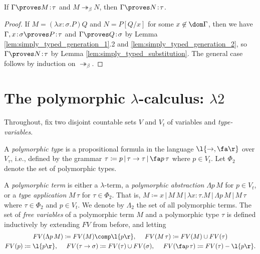 \documentclass[reqno]{amsart}
\begin{document}
    \begin{theorem}\label{thm:simply_typed_subject_reduction}
        If $\Gamma\proves M\!:\!\tau$ and $M\twoheadrightarrow_\beta N$, then $\Gamma\proves N\!:\!\tau$.
    \end{theorem}
    \begin{proof}
        If $M=(\lambda x\!:\!\sigma.P)Q$ and $N=P[Q/x]$ for some $x\not\in\dom\Gamma$, then we have $\Gamma,x\!:\!\sigma\proves P\!:\!\tau$ and $\Gamma\proves Q\!:\!\sigma$ by Lemma \ref{lem:simply_typed_generation_1}.2 and \ref{lem:simply_typed_generation_2}, so $\Gamma\proves N\!:\!\tau$ by Lemma \ref{lem:simply_typed_substitution}. The general case follows by induction on $\twoheadrightarrow_\beta$.
    \end{proof}

    \section{The polymorphic $\lambda$-calculus: $\lambda2$}

    Throughout, fix two disjoint countable sets $V$ and $V_t$ of variables and \textit{type-variables}.

    \begin{definition}
        A \textit{polymorphic type} is a propositional formula in the language $\l\{\rightarrow,\fa\r\}$ over $V_\tau$, i.e., defined by the grammar $\tau\coloneqq p\,|\,\tau\rightarrow\tau\,|\,\fa p\,\tau$ where $p\in V_t$. Let $\Phi_2$ denote the set of polymorphic types.
    \end{definition}

    \begin{definition}
        A \textit{polymorphic term} is either a $\lambda$-term, a \textit{polymorphic abstraction} $\Lambda p\,M$ for $p\in V_t$, or a \textit{type application} $M\,\tau$ for $\tau\in\Phi_2$. That is, $M\coloneqq x\,|\,M\,M\,|\,\lambda x\!:\!\tau.M\,|\,\Lambda p\,M\,|\,M\,\tau$ where $\tau\in\Phi_2$ and $p\in V_t$. We denote by $\Lambda_2$ the set of all polymorphic terms. The set of \textit{free variables} of a polymorphic term $M$ and a polymorphic type $\tau$ is defined inductively by extending $FV$ from before, and letting
        \begin{equation*}
            \begin{gathered}
                FV(\Lambda p\,M)\coloneqq FV(M)\comp\l\{p\r\},\ \ \ \ FV(M\,\tau)\coloneqq FV(M)\cup FV(\tau) \\
                FV(p)\coloneqq\l\{p\r\},\ \ \ \ FV(\tau\rightarrow\sigma)\coloneqq FV(\tau)\cup FV(\sigma),\ \ \ \ FV(\fa p\,\tau)\coloneqq FV(\tau)-\l\{p\r\}.
            \end{gathered}
        \end{equation*}
    \end{definition}
\end{document}

